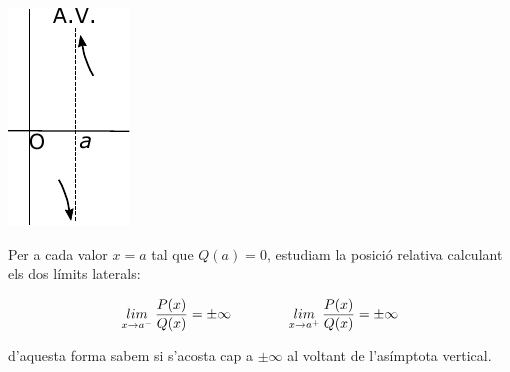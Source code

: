 \begin{theorybox}
	\begin{minipage}{0.2\textwidth}
		\centering
		\includegraphics[width=\textwidth]{img-06/asimptota-vertical}	
	\end{minipage}	
	\begin{minipage}{0.7\textwidth}
		Per a cada valor $x=a$ tal que $Q(a)=0$, estudiam la posició relativa calculant els dos límits laterals:
		
		\[ \mathop{lim}\limits_{x\to a^-} \dfrac{P(x)}{Q(x)}=\pm \infty  \qquad\qquad \mathop{lim}\limits_{x\to a^+} \dfrac{P(x)}{Q(x)}=\pm\infty \]	
		
		d'aquesta forma sabem si s'acosta cap a $\pm \infty$ al voltant de l'asímptota vertical.
	\end{minipage}
\end{theorybox}

